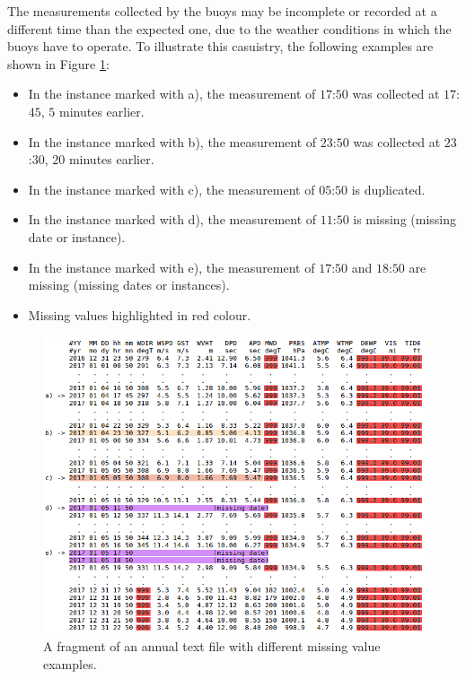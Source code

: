 \documentclass[energies,article,submit,moreauthors,pdftex]{Definitions/mdpi}
\begin{document}
		The measurements collected by the buoys may be incomplete or recorded at a different time than the expected one, due to the weather conditions in which the buoys have to operate. To illustrate this casuistry, the following examples are shown in Figure \ref{fig:measurements}:
		\begin{itemize}[leftmargin=*,labelsep=5.8mm]
			\item In the instance marked with a), the measurement of $17$:$50$ was collected at $17$:$45$, $5$ minutes earlier.
			\item In the instance marked with b), the measurement of $23$:$50$ was collected at $23$:$30$, $20$ minutes earlier.
			\item In the instance marked with c), the measurement of $05$:$50$ is duplicated.
			\item In the instance marked with d), the measurement of $11$:$50$ is missing (missing date or instance).
			\item In the instance marked with e), the measurement of $17$:$50$ and $18$:$50$ are missing (missing dates or instances).
			\item Missing values highlighted in red colour.
		\end{itemize}
		
		\begin{figure}[H]
			\centering
			\includegraphics[scale=0.45]{figures/FigureMeasurements.png}
			\caption{A fragment of an annual text file with different missing value examples.}
			\label{fig:measurements}
		\end{figure}
		
\end{document}
